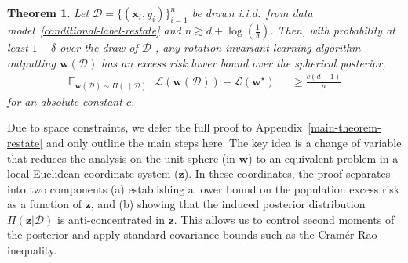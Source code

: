 \documentclass{article}
\theoremstyle{plain}
\newtheorem{theorem}{Theorem}[section]
\theoremstyle{definition}
\theoremstyle{remark}
\begin{document}


\begin{theorem}
\label{excess-risk-low-main}
Let $\mathcal{D} = \{(\mathbf{x}_i,y_i)\}_{i=1}^n$
be drawn i.i.d.\ from data model~\eqref{conditional-label-restate} and $n \gtrsim d +\log(\frac{1}{\delta})$. Then, with probability at least $1-\delta$ over the draw of $\mathcal{D}$ , any rotation-invariant learning algorithm outputting $\mathbf{w}(\mathcal{D})$ has an excess risk lower bound over the spherical posterior,
\begin{align}
\mathbb E_{\boldsymbol w(\mathcal{D})\sim \Pi(\cdot\mid \mathcal{D})} \left[\mathcal{L}(\mathbf{w}(\mathcal{D})) - \mathcal{L}(\mathbf{w}^{\star})\right]
&\ge
\frac{c (d-1)}{n}
\end{align}
for an absolute constant $c$. 
\end{theorem}
Due to space constraints, we defer the full proof to Appendix~\ref{main-theorem-restate} and only outline the main steps here. The key idea is a change of variable that reduces the analysis on the unit sphere (in $\mathbf{w}$) to an equivalent problem in a local Euclidean coordinate system ($\mathbf{z}$).
In these coordinates, the proof separates into two components (a) establishing a lower bound on the population excess risk as a function of $\mathbf{z}$, and (b) showing that the induced posterior distribution $\Pi(\mathbf{z}|\mathcal{D})$ is anti-concentrated in $\mathbf{z}$. This allows us to control second moments of the posterior and apply standard covariance bounds such as the Cram\'er-Rao inequality.
\end{document}
